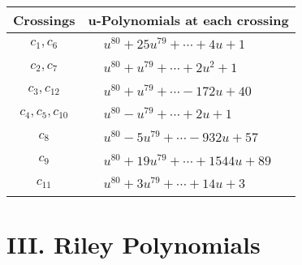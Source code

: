 \documentclass[1p]{elsarticle_modified}
\theoremstyle{definition}
\begin{document}
\begin{tabular}{m{50pt}|m{274pt}}
Crossings & \hspace{64pt}u-Polynomials at each crossing \\
\hline $$\begin{aligned}c_{1},c_{6}\end{aligned}$$&$\begin{aligned}
&u^{80}+25 u^{79}+\cdots+4 u+1
\end{aligned}$\\
\hline $$\begin{aligned}c_{2},c_{7}\end{aligned}$$&$\begin{aligned}
&u^{80}+u^{79}+\cdots+2 u^2+1
\end{aligned}$\\
\hline $$\begin{aligned}c_{3},c_{12}\end{aligned}$$&$\begin{aligned}
&u^{80}+u^{79}+\cdots-172 u+40
\end{aligned}$\\
\hline $$\begin{aligned}c_{4},c_{5},c_{10}\end{aligned}$$&$\begin{aligned}
&u^{80}- u^{79}+\cdots+2 u+1
\end{aligned}$\\
\hline $$\begin{aligned}c_{8}\end{aligned}$$&$\begin{aligned}
&u^{80}-5 u^{79}+\cdots-932 u+57
\end{aligned}$\\
\hline $$\begin{aligned}c_{9}\end{aligned}$$&$\begin{aligned}
&u^{80}+19 u^{79}+\cdots+1544 u+89
\end{aligned}$\\
\hline $$\begin{aligned}c_{11}\end{aligned}$$&$\begin{aligned}
&u^{80}+3 u^{79}+\cdots+14 u+3
\end{aligned}$\\
\hline
\end{tabular}\newpage\renewcommand{\arraystretch}{1}
\centering \section*{ III. Riley Polynomials}
\end{document}

